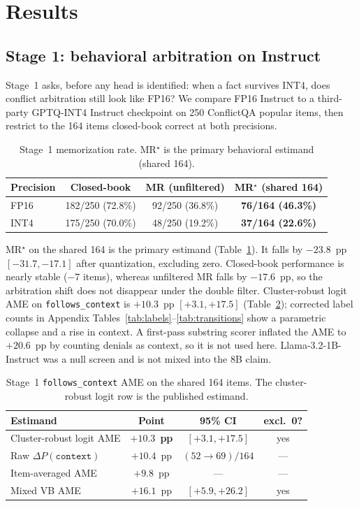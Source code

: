 \documentclass{article} %
\begin{document}
\section{Results}
\label{sec:results}

\subsection{Stage 1: behavioral arbitration on Instruct}
\label{sec:stage1}

Stage~1 asks, before any head is identified: when a fact survives INT4, does conflict arbitration still look like FP16? We compare FP16 Instruct to a third-party GPTQ-INT4 Instruct checkpoint on 250 ConflictQA popular items, then restrict to the 164 items closed-book correct at both precisions.

\begin{table}[t]
\caption{Stage~1 memorization rate. MR$^\star$ is the primary behavioral estimand (shared 164).}
\label{tab:mrstar}
\centering
\small
\begin{tabular}{lccc}
\toprule
Precision & Closed-book & MR (unfiltered) & MR$^\star$ (shared 164) \\
\midrule
FP16 & 182/250 (72.8\%) & 92/250 (36.8\%) & \textbf{76/164 (46.3\%)} \\
INT4 & 175/250 (70.0\%) & 48/250 (19.2\%) & \textbf{37/164 (22.6\%)} \\
\bottomrule
\end{tabular}
\end{table}

MR$^\star$ on the shared 164 is the primary estimand (Table~\ref{tab:mrstar}). It falls by $-23.8$~pp $[-31.7,-17.1]$ after quantization, excluding zero. Closed-book performance is nearly stable ($-7$ items), whereas unfiltered MR falls by $-17.6$~pp, so the arbitration shift does not disappear under the double filter. Cluster-robust logit AME on \texttt{follows\_context} is $+10.3$~pp $[+3.1,+17.5]$ (Table~\ref{tab:ame}); corrected label counts in Appendix Tables~\ref{tab:labels}--\ref{tab:transitions} show a parametric collapse and a rise in context. A first-pass substring scorer inflated the AME to $+20.6$~pp by counting denials as context, so it is not used here. Llama-3.2-1B-Instruct was a null screen and is not mixed into the 8B claim.

\begin{table}[t]
\caption{Stage~1 \texttt{follows\_context} AME on the shared 164 items. The cluster-robust logit row is the published estimand.}
\label{tab:ame}
\centering
\small
\begin{tabular}{lccc}
\toprule
Estimand & Point & 95\% CI & excl.\ 0? \\
\midrule
Cluster-robust logit AME & $\mathbf{+10.3}$~\textbf{pp} & $\mathbf{[+3.1, +17.5]}$ & yes \\
Raw $\Delta P(\texttt{context})$ & $+10.4$~pp & $(52{\to}69)/164$ & --- \\
Item-averaged AME & $+9.8$~pp & --- & --- \\
Mixed VB AME & $+16.1$~pp & $[+5.9, +26.2]$ & yes \\
\bottomrule
\end{tabular}
\end{table}
\end{document}
